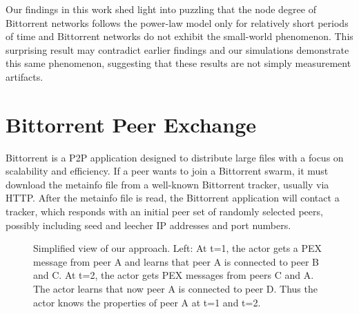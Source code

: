 \documentclass[10pt,conference,letterpaper]{IEEEtran}
\begin{document}
Our findings in this work shed light into puzzling that the node degree of Bittorrent networks follows the power-law model only for relatively short periods of time and Bittorrent networks do not exhibit the small-world phenomenon. 
This surprising result may contradict earlier findings and our simulations demonstrate this same phenomenon, suggesting that these results are not simply measurement artifacts.

\section{Bittorrent Peer Exchange}\label{background}
Bittorrent is a P2P application designed to distribute large files with a focus on scalability and efficiency.  
If a peer wants to join a Bittorrent swarm, it must download the metainfo file from a well-known Bittorrent tracker, usually via HTTP. 
After the metainfo file is read, the Bittorrent application will contact a tracker, which responds with an initial peer set of randomly selected peers, possibly including seed and leecher IP addresses and port numbers.  

\begin{figure}
\centering
{}
\caption{Simplified view of our approach. Left: At t=1, the actor gets a PEX message from peer A and
learns that peer A is connected to peer B and C. At t=2, the actor gets  PEX messages from peers C and A. The actor
learns that now peer A is connected to peer D. Thus the actor knows the properties of peer A at t=1 and t=2.} 
\label{fig:pexworks}
\end{figure}
\end{document}
